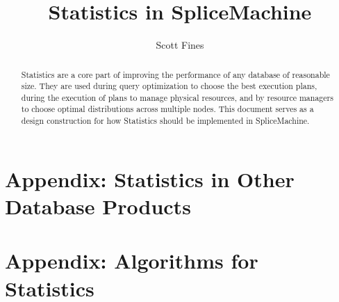 \documentclass[10pt]{amsart}
\begin{document}
\title{Statistics in SpliceMachine}
\author{Scott Fines}

\begin{abstract}
				Statistics are a core part of improving the performance of any database of reasonable size. They are used during query optimization to choose the best execution plans, during the execution of plans to manage physical resources, and by resource managers to choose optimal distributions across multiple nodes. This document serves as a design construction for how Statistics should be implemented in SpliceMachine.
\end{abstract}

\maketitle


\clearpage
\begin{subappendices}
				\section*{Appendix: Statistics in Other Database Products}
				\label{sec:OtherDBs}
				
				\clearpage
				\section*{Appendix: Algorithms for Statistics}
				\label{sec:Algorithms}
				
\end{subappendices}

\clearpage
\printbibliography
\end{document}
